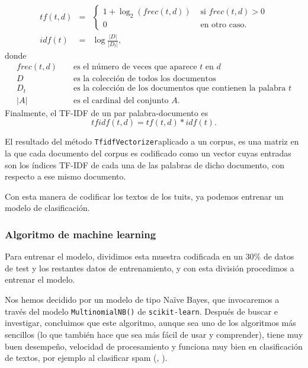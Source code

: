 $$\begin{array}{rcl}
tf(t,d) &=& \left\{\begin{array}{ll}
1+\log_2(frec(t,d)) &\mbox{ si }frec(t,d)>0\\
0&\mbox{ en otro caso.}
\end{array}\right.\\
idf(t) &=& \log\frac{|D|}{|D_t|},
\end{array}
$$
donde
\begin{eqnarray*}
frec(t,d) &&\mbox{ es el número de veces que aparece $t$ en $d$}\\
D&& \mbox{ es la colección de todos los documentos }\\
D_t&& \mbox{ es la colección de los documentos que contienen la palabra }t\\
|A| && \mbox{ es el cardinal del conjunto }A.
\end{eqnarray*}
Finalmente, el TF-IDF de un par palabra-documento es
$$tfidf(t,d)=tf(t,d)*idf(t).$$

El resultado del método {\tt TfidfVectorizer}aplicado a un corpus, 
es una matriz en la que cada documento
del corpus es codificado como un vector cuyas entradas son los índices TF-IDF de cada
una de las palabras de dicho documento, con respecto a ese mismo documento.

Con esta manera de codificar los textos de los tuits, ya podemos entrenar un modelo 
de clasificación.

\subsubsection{Algoritmo de machine learning}
Para entrenar el modelo, dividimos esta muestra codificada en un $30$\% de datos de test y los restantes datos de entrenamiento,
y con esta división procedimos a entrenar el modelo.

Nos hemos decidido por un modelo de tipo Naïve Bayes, que 
invocaremos a través del modelo {\tt MultinomialNB()} de {\tt  scikit-learn}. Después de buscar e investigar, concluimos que este algoritmo,  aunque sea uno de los algoritmos más sencillos (lo que también hace que sea más fácil de usar y comprender), tiene muy buen desempeño, velocidad de procesamiento y funciona muy bien en clasificación de textos, por ejemplo al clasificar spam (\cite{notas_antonio}, \cite{nltk_book}).

